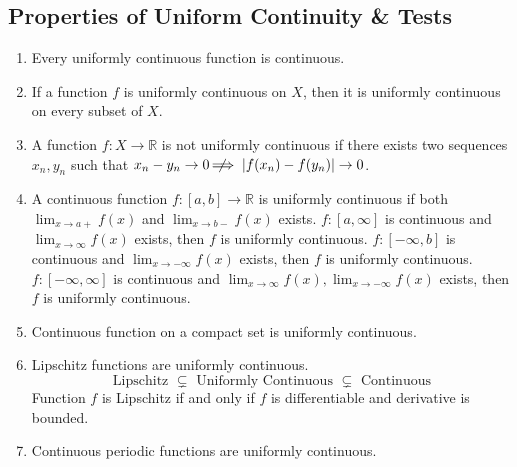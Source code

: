 \subsection{Properties of Uniform Continuity \& Tests}
\begin{enumerate}
	\item Every uniformly continuous function is continuous.
	\item If a function $f$ is uniformly continuous on $X$, then it is uniformly continuous on every subset of $X$.
	\item A function $f : X \to \mathbb{R}$ is not uniformly continuous if there exists two sequences $x_n,y_n$ such that $x_n-y_n \to 0 \;\not\nobreak\!\!\!\!\implies |f(x_n)-f(y_n)| \to 0$.
	\item A continuous function $f : [a,b] \to \mathbb{R}$ is uniformly continuous if both $\displaystyle \lim_{x \to a+} f(x)$ and $\displaystyle \lim_{x \to b-} f(x)$ exists.
		\subitem $f : [a,\infty]$ is continuous and $\displaystyle \lim_{x\to \infty} f(x)$ exists, then $f$ is uniformly continuous.
		\subitem $f : [-\infty,b]$ is continuous and $\displaystyle \lim_{x \to -\infty} f(x)$ exists, then $f$ is uniformly continuous.
		\subitem $f : [-\infty,\infty]$ is continuous and $\displaystyle \lim_{x \to \infty} f(x), \lim_{x \to -\infty} f(x)$ exists, then $f$ is uniformly continuous.
	\item Continuous function on a compact set is uniformly continuous.
	\item Lipschitz functions are uniformly continuous.
		$$ \text{ Lipschitz } \subsetneq \text{ Uniformly Continuous } \subsetneq \text{ Continuous } $$
	\subitem Function $f$ is Lipschitz if and only if $f$ is differentiable and derivative is bounded.
	\item Continuous periodic functions are uniformly continuous.
\end{enumerate}

